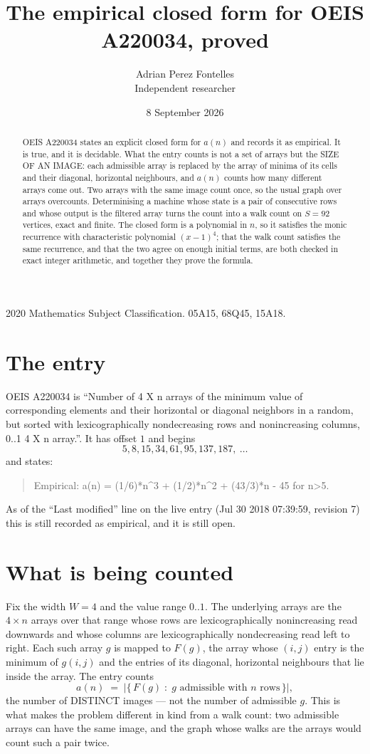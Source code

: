 \documentclass[11pt,a4paper]{article}
\title{The empirical closed form for OEIS A220034, proved}
\author{Adrian Perez Fontelles\\ \small Independent researcher}
\date{8 September 2026}
\theoremstyle{plain}
\theoremstyle{definition}
\begin{document}
\maketitle

\begin{abstract}
OEIS A220034 states an explicit closed form for $a(n)$ and records it as empirical. It is true, and
it is decidable. What the entry counts is not a set of arrays but the SIZE OF AN IMAGE: each
admissible array is replaced by the array of minima of its cells and their diagonal, horizontal neighbours,
and $a(n)$ counts how many different arrays come out. Two arrays with the same image count
once, so the usual graph over arrays overcounts. Determinising a machine whose state is a pair
of consecutive rows and whose output is the filtered array turns the count into a walk count on
$S=92$ vertices, exact and finite. The closed form is a polynomial in $n$, so it satisfies the
monic recurrence with characteristic polynomial $(x-1)^{4}$; that the walk count
satisfies the same recurrence, and that the two agree on enough initial terms, are both checked
in exact integer arithmetic, and together they prove the formula.
\end{abstract}

\noindent\small 2020 Mathematics Subject Classification. 05A15, 68Q45, 15A18.\normalsize

\section{The entry}

OEIS A220034 is ``Number of 4 X n arrays of the minimum value of corresponding elements and their horizontal or diagonal neighbors in a random, but sorted with lexicographically nondecreasing rows and nonincreasing columns, 0..1 4 X n array.''. It has offset $1$ and begins
\[
5, 8, 15, 34, 61, 95, 137, 187,\ \dots
\]
and states:
\begin{quote}
Empirical: a(n) = (1/6)*n\^{}3 + (1/2)*n\^{}2 + (43/3)*n - 45 for n>5.
\end{quote}
As of the ``Last modified'' line on the live entry (Jul 30 2018 07:39:59, revision 7)
this is still recorded as empirical, and it is still open.

\section{What is being counted}

Fix the width $W=4$ and the value range $0..1$. The underlying arrays are the
$4\times n$ arrays over that range whose rows are lexicographically nonincreasing read downwards
and whose columns are lexicographically nondecreasing read left to right. Each such array $g$
is mapped to $F(g)$, the array whose $(i,j)$ entry is the minimum of $g(i,j)$ and the entries
of its diagonal, horizontal neighbours that lie inside the array. The entry counts
\[
a(n)\;=\;\bigl|\{\,F(g)\;:\;g\text{ admissible with }n\text{ rows}\,\}\bigr|,
\]
the number of DISTINCT images --- not the number of admissible $g$. This is what makes the
problem different in kind from a walk count: two admissible arrays can have the same image, and
the graph whose walks are the arrays would count such a pair twice.
\end{document}

